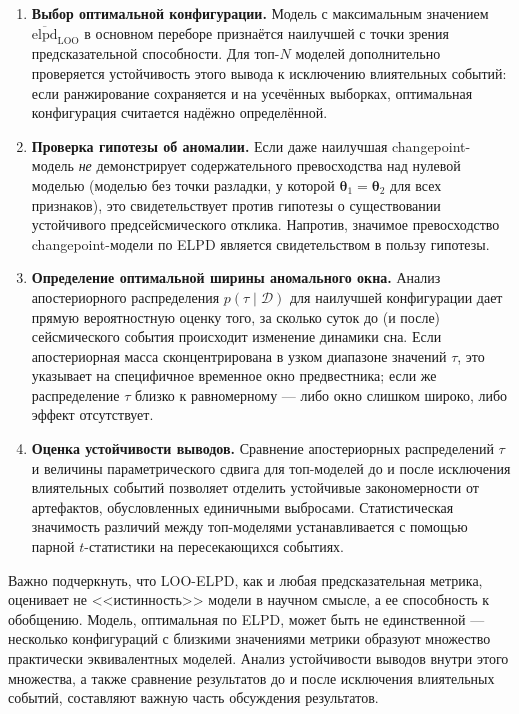 \documentclass[14pt]{mmcs_article}
\begin{document}
\begin{enumerate}
	\item \textbf{Выбор оптимальной конфигурации.}
	Модель с максимальным значением
	$\overline{\mathrm{elpd}}_{\mathrm{LOO}}$ в основном
	переборе признаётся наилучшей с точки зрения
	предсказательной способности. Для топ-$N$ моделей
	дополнительно проверяется устойчивость этого вывода к
	исключению влиятельных событий: если ранжирование
	сохраняется и на усечённых выборках, оптимальная
	конфигурация считается надёжно определённой.
	
	\item \textbf{Проверка гипотезы об аномалии.}
	Если даже наилучшая changepoint-модель \textit{не}
	демонстрирует содержательного превосходства над нулевой
	моделью (моделью без точки разладки, у которой
	$\boldsymbol{\theta}_1 = \boldsymbol{\theta}_2$ для всех
	признаков), это свидетельствует против гипотезы о
	существовании устойчивого предсейсмического отклика.
	Напротив, значимое превосходство changepoint-модели по
	ELPD является свидетельством в пользу гипотезы.
	
	\item \textbf{Определение оптимальной ширины аномального
		окна.} Анализ апостериорного распределения
	$p(\tau \mid \mathcal{D})$ для наилучшей конфигурации
	дает прямую вероятностную оценку того, за сколько суток
	до (и после) сейсмического события происходит изменение
	динамики сна. Если апостериорная масса сконцентрирована в
	узком диапазоне значений $\tau$, это указывает на
	специфичное временное окно предвестника; если же
	распределение $\tau$ близко к равномерному — либо окно
	слишком широко, либо эффект отсутствует.
	
    \item \textbf{Оценка устойчивости выводов.}
    Сравнение апостериорных распределений $\tau$ и величины
    параметрического сдвига для топ-моделей до и после
    исключения влиятельных событий позволяет отделить
    устойчивые закономерности от артефактов, обусловленных
    единичными выбросами. Статистическая значимость различий
    между топ-моделями устанавливается с помощью парной
    $t$-статистики на пересекающихся событиях.
\end{enumerate}

Важно подчеркнуть, что LOO-ELPD, как и любая предсказательная
метрика, оценивает не <<истинность>> модели в научном смысле, а
ее способность к обобщению. Модель, оптимальная по ELPD, может
быть не единственной — несколько конфигураций с близкими
значениями метрики образуют множество практически эквивалентных
моделей. Анализ устойчивости выводов внутри этого множества, а
также сравнение результатов до и после исключения влиятельных
событий, составляют важную часть обсуждения результатов.
\end{document}
